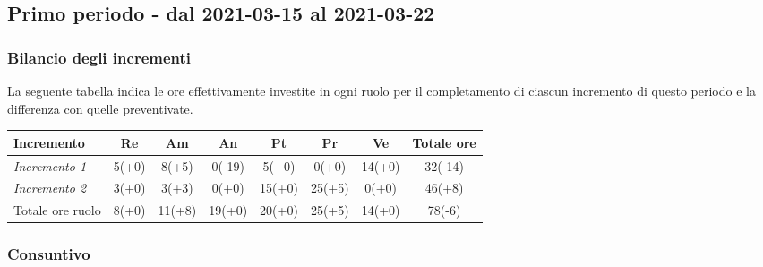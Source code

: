 {{{{{{\subsection{Primo periodo - dal 2021-03-15 al 2021-03-22}\label{ConsuntivoPrimoPeriodoDiProgettazioneDiDettaglioCodifica}

\subsubsection{Bilancio degli incrementi}\label{ConsuntivoPrimoPeriodoDiProgettazioneDiDettaglioCodificaIncrementi}

La seguente tabella indica le ore effettivamente investite in ogni ruolo per il completamento di ciascun incremento di questo periodo e la differenza con quelle preventivate.

\quad
\def\tabularxcolumn#1{m{#1}}
{
	
	\begin{center}
		\renewcommand{\arraystretch}{1.4}
		\begin{tabularx}{\textwidth}{|X|c|c|c|c|c|c|c|}
			\hline
			\rowcolor{airforceblue}
			\textbf{Incremento} & \textbf{Re} & \textbf{Am} & \textbf{An} & \textbf{Pt} & \textbf{Pr} & \textbf{Ve} & \textbf{Totale ore}\\
			\hline
			\textit{Incremento 1} & 5(+0) & 8(+5) & 0(-19) & 5(+0) & 0(+0) & 14(+0) & 32(-14) \\
			\hline
			\textit{Incremento 2} & 3(+0) & 3(+3) & 0(+0) & 15(+0) & 25(+5) & 0(+0) & 46(+8)\\
			\hline
			Totale ore ruolo & 8(+0) & 11(+8) & 19(+0) & 20(+0) & 25(+5) & 14(+0) & 78(-6)\\
			\hline
		\end{tabularx}
	\end{center}

\subsubsection{Consuntivo}\label{ConsuntivoPrimoPeriodoDiProgettazioneDiDettaglioCodificaIncrementiCosto}

}}}}}}}
